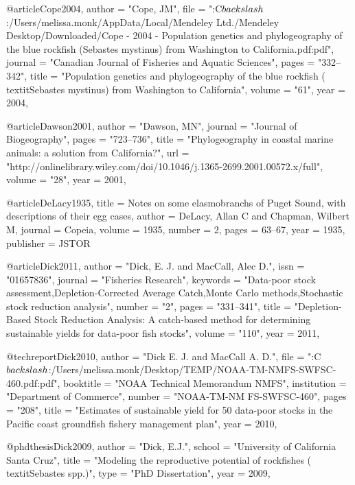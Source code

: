 @article{Cope2004,
    author = "{Cope, JM}",
    file = "{:C$\\backslash$:/Users/melissa.monk/AppData/Local/Mendeley Ltd./Mendeley Desktop/Downloaded/Cope - 2004 - Population genetics and phylogeography of the blue rockfish (Sebastes mystinus) from Washington to California.pdf:pdf}",
    journal = "{Canadian Journal of Fisheries and Aquatic Sciences}",
    pages = "{332--342}",
    title = "{{Population genetics and phylogeography of the blue rockfish (\\textit{{Sebastes} mystinus}) from Washington to California}}",
    volume = "{61}",
    year = 2004,
}

@article{Dawson2001,
    author = "{Dawson, MN}",
    journal = "{Journal of Biogeography}",
    pages = "{723--736}",
    title = "{{Phylogeography in coastal marine animals: a solution from California?}}",
    url = "{http://onlinelibrary.wiley.com/doi/10.1046/j.1365-2699.2001.00572.x/full}",
    volume = "{28}",
    year = 2001,
}

@article{DeLacy1935,
  title = {Notes on some elasmobranchs of Puget Sound, with descriptions of their egg cases},
  author = {DeLacy, Allan C and Chapman, Wilbert M},
  journal = {Copeia},
  volume = {1935},
  number = {2},
  pages = {63--67},
  year = 1935,
  publisher = {JSTOR}
}

@article{Dick2011,
    author = "{Dick, E. J. and MacCall, Alec D.}",
    issn = "{01657836}",
    journal = "{Fisheries Research}",
    keywords = "{Data-poor stock assessment,Depletion-Corrected Average Catch,Monte Carlo methods,Stochastic stock reduction analysis}",
    number = "{2}",
    pages = "{331--341}",
    title = "{{Depletion-Based Stock Reduction Analysis: A catch-based method for determining sustainable yields for data-poor fish stocks}}",
    volume = "{110}",
    year = 2011,
}

@techreport{Dick2010,
    author = "{Dick E. J. and MacCall A. D.}",
    file = "{:C$\\backslash$:/Users/melissa.monk/Desktop/TEMP/NOAA-TM-NMFS-SWFSC-460.pdf:pdf}",
    booktitle = "{NOAA Technical Memorandum NMFS}",
    institution = "{Department of Commerce}",
    number = "{NOAA-TM-NM FS-SWFSC-460}",
    pages = "{208}",
    title = "{{Estimates of sustainable yield for 50 data-poor stocks in the Pacific coast groundfish fishery management plan}}",
    year = 2010,
}

@phdthesis{Dick2009,
    author = "{Dick, E.J.}",
    school = "{University of California Santa Cruz}",
    title = "{{Modeling the reproductive potential of rockfishes (\\textit{{Sebastes}} spp.)}}",
    type = "{PhD Dissertation}",
    year = 2009,
}


